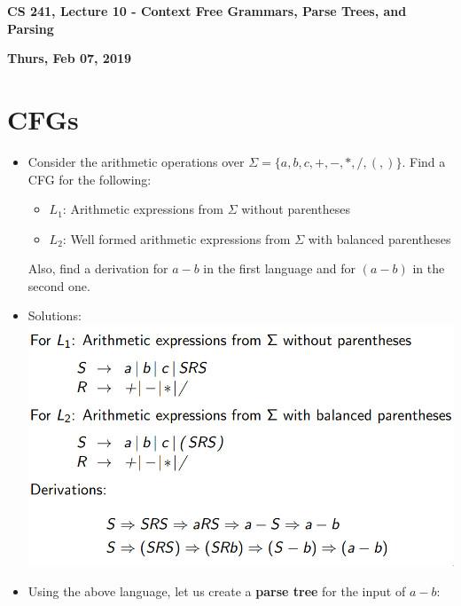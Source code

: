 \documentclass[12pt]{article}
\author{Clement Tsang}
\begin{document}
\begin{center}
\Large\textbf{CS 241, Lecture 10 - Context Free Grammars, Parse Trees, and Parsing}
\end{center}
\begin{center}
\textbf{Thurs, Feb 07, 2019}
\end{center}

\section{CFGs}
\begin{itemize}
    \item Consider the arithmetic operations over $\Sigma = \{a, b, c, +, -, *, /, (, )\}$.  Find a CFG for the following:
        \begin{itemize}
            \item $L_1$: Arithmetic expressions from $\Sigma$ without parentheses
            \item $L_2$: Well formed arithmetic expressions from $\Sigma$ with balanced parentheses
        \end{itemize}
        Also, find a derivation for $a - b$ in the first language and for $(a - b)$ in the second one.
    \item Solutions: \\
        \includegraphics[scale=0.4]{cfg_example.png}
    \item Using the above language, let us create a \textbf{parse tree} for the input of $a-b$:\\

\end{itemize}
\end{document}
